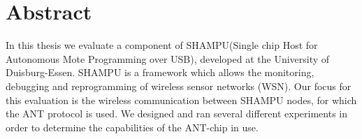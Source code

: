 
\cleardoublepage
\section*{Abstract}
In this thesis we evaluate a component of SHAMPU(Single chip Host for Autonomous Mote Programming over USB), developed at the University of Duisburg-Essen. 
SHAMPU is a framework which allows the monitoring, debugging and reprogramming of wireless sensor networks (WSN). 
Our focus for this evaluation is the wireless communication between SHAMPU nodes, for which the ANT protocol is used. 
We designed and ran several different experiments in order to determine the capabilities of the ANT-chip in use.
\cleardoublepage
